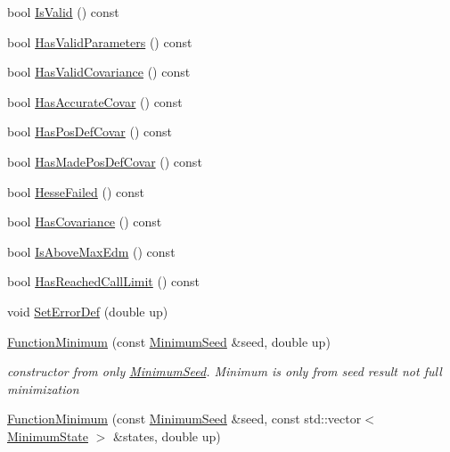 \begin{DoxyCompactItemize}
\item 
bool \mbox{\hyperlink{classROOT_1_1Minuit2_1_1FunctionMinimum_a6525270e63f1cf16206387257b247b69}{Is\+Valid}} () const
\item 
bool \mbox{\hyperlink{classROOT_1_1Minuit2_1_1FunctionMinimum_a723b0ab6157e57113a142f1d4a31ace2}{Has\+Valid\+Parameters}} () const
\item 
bool \mbox{\hyperlink{classROOT_1_1Minuit2_1_1FunctionMinimum_ac2510d8f560ddac6b2911bda454e2948}{Has\+Valid\+Covariance}} () const
\item 
bool \mbox{\hyperlink{classROOT_1_1Minuit2_1_1FunctionMinimum_a5135f697042ef9ad81c68185c8610019}{Has\+Accurate\+Covar}} () const
\item 
bool \mbox{\hyperlink{classROOT_1_1Minuit2_1_1FunctionMinimum_acb9f7255fdd8afdb460bfe13e6d119c4}{Has\+Pos\+Def\+Covar}} () const
\item 
bool \mbox{\hyperlink{classROOT_1_1Minuit2_1_1FunctionMinimum_a7c0f417444609960c3b55bc869bf04d8}{Has\+Made\+Pos\+Def\+Covar}} () const
\item 
bool \mbox{\hyperlink{classROOT_1_1Minuit2_1_1FunctionMinimum_a6400b299323d7e632692229ce026056c}{Hesse\+Failed}} () const
\item 
bool \mbox{\hyperlink{classROOT_1_1Minuit2_1_1FunctionMinimum_ae11c13bd945f21476482d928bf96b791}{Has\+Covariance}} () const
\item 
bool \mbox{\hyperlink{classROOT_1_1Minuit2_1_1FunctionMinimum_aa87b9f0f50a77d219976b8767e39ac0f}{Is\+Above\+Max\+Edm}} () const
\item 
bool \mbox{\hyperlink{classROOT_1_1Minuit2_1_1FunctionMinimum_a524af3e3da7a975e7a104845c6a41ceb}{Has\+Reached\+Call\+Limit}} () const
\item 
void \mbox{\hyperlink{classROOT_1_1Minuit2_1_1FunctionMinimum_af45892d274c493850fc78e9917f17781}{Set\+Error\+Def}} (double up)
\item 
\mbox{\hyperlink{classROOT_1_1Minuit2_1_1FunctionMinimum_a907871106f0be755404d80f32fbe2041}{Function\+Minimum}} (const \mbox{\hyperlink{classROOT_1_1Minuit2_1_1MinimumSeed}{Minimum\+Seed}} \&seed, double up)
\begin{DoxyCompactList}\small\item\em constructor from only \mbox{\hyperlink{classROOT_1_1Minuit2_1_1MinimumSeed}{Minimum\+Seed}}. Minimum is only from seed result not full minimization \end{DoxyCompactList}\item 
\mbox{\hyperlink{classROOT_1_1Minuit2_1_1FunctionMinimum_a0d5de11a4f528f8c0a0d061dbcf3e91e}{Function\+Minimum}} (const \mbox{\hyperlink{classROOT_1_1Minuit2_1_1MinimumSeed}{Minimum\+Seed}} \&seed, const std\+::vector$<$ \mbox{\hyperlink{classROOT_1_1Minuit2_1_1MinimumState}{Minimum\+State}} $>$ \&states, double up)

\end{DoxyCompactItemize}
